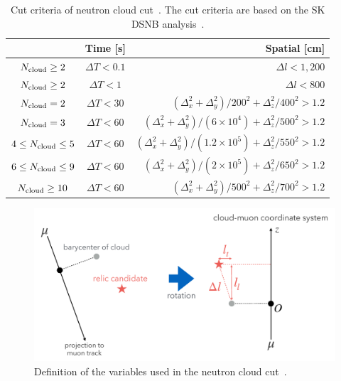 \begin{table}[h]
	\centering
	\caption[Cut criteria of neutron cloud cut]{
	Cut criteria of neutron cloud cut~\cite{2023HaradaPhD}.
	The cut criteria are based on the SK DSNB analysis~\cite{2021Abe}.
	}\label{tab:ncloud}
	\vs
	\begin{tabular}{ccr} \hline \hline
		                              & Time [s]         & Spatial [cm]                                                                           \\ \hline
		$N_{\rm cloud} \geq 2$        & $\Delta T < 0.1$ & $\Delta l < 1,200$                                                                     \\
		$N_{\rm cloud} \geq 2$        & $\Delta T < 1$   & $\Delta l < 800$                                                                       \\
		$N_{\rm cloud} = 2$           & $\Delta T < 30$  & $(\Delta_{x}^{2} + \Delta_{y}^{2})/200^{2} + \Delta_{z}^{2}/400^{2} > 1.2$             \\
		$N_{\rm cloud} = 3$           & $\Delta T < 60$  & $(\Delta_{x}^{2} + \Delta_{y}^{2})/(6 \times 10^{4}) + \Delta_{z}^{2}/500^{2} > 1.2$   \\
		$4 \leq N_{\rm cloud} \leq 5$ & $\Delta T < 60$  & $(\Delta_{x}^{2} + \Delta_{y}^{2})/(1.2 \times 10^{5}) + \Delta_{z}^{2}/550^{2} > 1.2$ \\
		$6 \leq N_{\rm cloud} \leq 9$ & $\Delta T < 60$  & $(\Delta_{x}^{2} + \Delta_{y}^{2})/(2 \times 10^{5}) + \Delta_{z}^{2}/650^{2} > 1.2$   \\
		$N_{\rm cloud} \geq 10$       & $\Delta T < 60$  & $(\Delta_{x}^{2} + \Delta_{y}^{2})/500^{2} + \Delta_{z}^{2}/700^{2} > 1.2$             \\ \hline \hline
	\end{tabular}
\end{table}

\begin{figure}[h]
	\centering
	\includegraphics[width=12cm]{Figures/Selection/def_ncloud}
	\caption[Definition of the variables used in the neutron cloud cut]{
	Definition of the variables used in the neutron cloud cut~\cite{2023HaradaPhD}.
	}\label{def_ncloud}
\end{figure}

